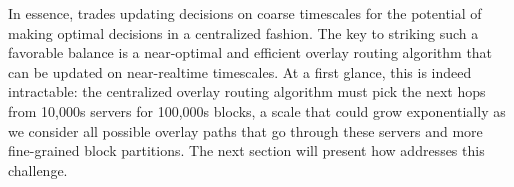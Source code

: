 In essence, \name trades updating decisions on coarse timescales
for the potential of making optimal decisions in a centralized
fashion.
The key to striking such a favorable balance is a
near-optimal and efficient overlay routing
algorithm that can be updated on near-realtime timescales.
At a first glance, this is indeed intractable:
the centralized overlay routing algorithm must pick the next hops
from 10,000s servers for 100,000s blocks, a scale that could
grow exponentially as we consider all possible
overlay paths that go through these servers and more fine-grained block partitions.
The next section  will present how \name addresses this challenge.


%
%
%
%
%
%




